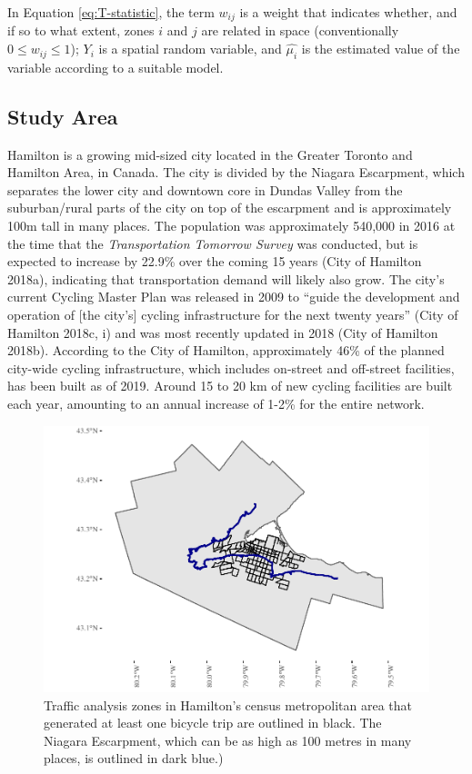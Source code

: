 \documentclass[smallextended]{svjour3}       %
\begin{document}
In Equation \ref{eq:T-statistic}, the term \(w_{ij}\) is a weight that
indicates whether, and if so to what extent, zones \(i\) and \(j\) are
related in space (conventionally \(0\le w_{ij}\le 1\)); \(Y_i\) is a
spatial random variable, and \(\hat{\mu_i}\) is the estimated value of
the variable according to a suitable model.

\hypertarget{study-area}{%
\subsection{Study Area}\label{study-area}}

Hamilton is a growing mid-sized city located in the Greater Toronto and
Hamilton Area, in Canada. The city is divided by the Niagara Escarpment,
which separates the lower city and downtown core in Dundas Valley from
the suburban/rural parts of the city on top of the escarpment and is
approximately 100m tall in many places. The population was approximately
540,000 in 2016 at the time that the \emph{Transportation Tomorrow
Survey} was conducted, but is expected to increase by 22.9\% over the
coming 15 years (City of Hamilton 2018a), indicating that transportation
demand will likely also grow. The city's current Cycling Master Plan was
released in 2009 to ``guide the development and operation of {[}the
city's{]} cycling infrastructure for the next twenty years'' (City of
Hamilton 2018c, i) and was most recently updated in 2018 (City of
Hamilton 2018b). According to the City of Hamilton, approximately 46\%
of the planned city-wide cycling infrastructure, which includes
on-street and off-street facilities, has been built as of 2019. Around
15 to 20 km of new cycling facilities are built each year, amounting to
an annual increase of 1-2\% for the entire network.

\begin{figure}
\centering
\includegraphics{Correlates-cycling-flows-routes_files/figure-latex/context-plot-1.pdf}
\caption{\label{fig:context-plot} Traffic analysis zones in Hamilton's
census metropolitan area that generated at least one bicycle trip are
outlined in black. The Niagara Escarpment, which can be as high as 100
metres in many places, is outlined in dark blue.)}
\end{figure}
\end{document}
